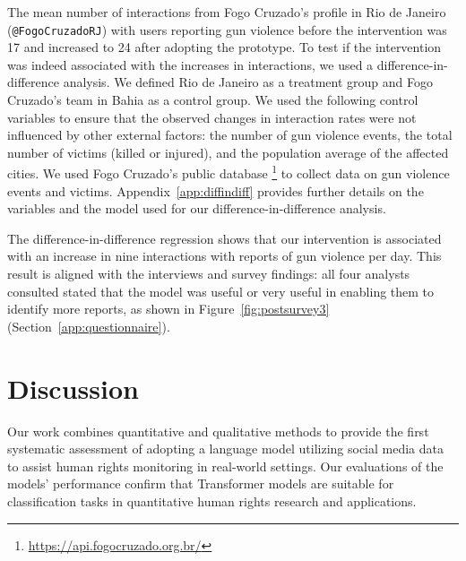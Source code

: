 \documentclass[11pt,letterpaper]{article}
\begin{document}
The mean number of interactions from Fogo Cruzado's profile in Rio de Janeiro (\nolinkurl{@FogoCruzadoRJ}) with users reporting gun violence before the intervention was 17 and increased to 24 after adopting the prototype. To test if the intervention was indeed associated with the increases in interactions, we used a difference-in-difference analysis. We defined Rio de Janeiro as a treatment group and Fogo Cruzado's team in Bahia as a control group. We used the following control variables to ensure that the observed changes in interaction rates were not influenced by other external factors: the number of gun violence events, the total number of victims (killed or injured), and the population average of the affected cities. We used Fogo Cruzado's public database \footnote{\url{https://api.fogocruzado.org.br/}} to collect data on gun violence events and victims. Appendix~\ref{app:diffindiff} provides further details on the variables and the model used for our difference-in-difference analysis. 

The difference-in-difference regression shows that our intervention is associated with an increase in nine interactions with reports of gun violence per day. This result is aligned with the interviews and survey findings: all four analysts consulted stated that the model was useful or very useful in enabling them to identify more reports, as shown in Figure~\ref{fig:postsurvey3} (Section~\ref{app:questionnaire}).

\section{Discussion}
\label{chap:discussion}
Our work combines quantitative and qualitative methods to provide the first systematic assessment of adopting a language model utilizing social media data to assist human rights monitoring in real-world settings. Our evaluations of the models' performance confirm that Transformer models are suitable for classification tasks in quantitative human rights research and applications. 
\end{document}
